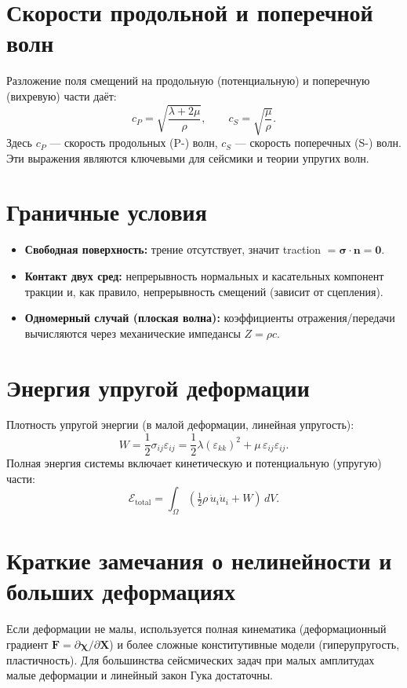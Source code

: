 \documentclass[12pt,a4paper]{article}
\begin{document}
\section{Скорости продольной и поперечной волн}
Разложение поля смещений на продольную (потенциальную) и поперечную (вихревую) части даёт:
\[
c_P = \sqrt{\frac{\lambda + 2\mu}{\rho}}, \qquad
c_S = \sqrt{\frac{\mu}{\rho}}.
\]
Здесь $c_P$ --- скорость продольных (P-) волн, $c_S$ --- скорость поперечных (S-) волн. Эти выражения являются ключевыми для сейсмики и теории упругих волн.

\section{Граничные условия}
\begin{itemize}
    \item \textbf{Свободная поверхность:} трение отсутствует, значит traction $=\boldsymbol{\sigma}\cdot\mathbf{n}=\mathbf{0}$.
    \item \textbf{Контакт двух сред:} непрерывность нормальных и касательных компонент тракции и, как правило, непрерывность смещений (зависит от сцепления).
    \item \textbf{Одномерный случай (плоская волна):} коэффициенты отражения/передачи вычисляются через механические импедансы $Z=\rho c$.
\end{itemize}

\section{Энергия упругой деформации}
Плотность упругой энергии (в малой деформации, линейная упругость):
\[
W = \frac12 \sigma_{ij}\varepsilon_{ij} = \frac12\lambda(\varepsilon_{kk})^2 + \mu\,\varepsilon_{ij}\varepsilon_{ij}.
\]
Полная энергия системы включает кинетическую и потенциальную (упругую) части:
\[
\mathcal{E}_{\text{total}} = \int_{\Omega}\left(\tfrac12\rho\,\dot u_i\dot u_i + W\right)\,dV.
\]

\section{Краткие замечания о нелинейности и больших деформациях}
Если деформации не малы, используется полная кинематика (деформационный градиент $\mathbf{F}=\partial\boldsymbol{\chi}/\partial\mathbf{X}$) и более сложные конститутивные модели (гиперупругость, пластичность). Для большинства сейсмических задач при малых амплитудах малые деформации и линейный закон Гука достаточны.
\end{document}
